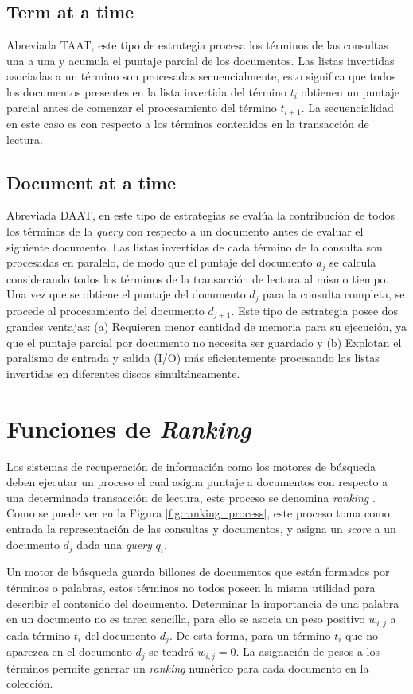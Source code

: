 \subsection{Term at a time}
Abreviada TAAT, este tipo de estrategia procesa los términos de las consultas una a una y acumula el puntaje parcial de los documentos. Las listas invertidas asociadas a un término son procesadas secuencialmente, esto significa que todos los documentos presentes en la lista invertida del término $t_{i}$ obtienen un puntaje parcial antes de comenzar el procesamiento del término $t_{i+1}$. La secuencialidad en este caso es con respecto a los términos contenidos en la transacción de lectura.

\subsection{Document at a time}
Abreviada DAAT, en este tipo de estrategias se evalúa la contribución de todos los términos de la \textit{query} con respecto a un documento antes de evaluar el siguiente documento. Las listas invertidas de cada término de la consulta son procesadas en paralelo, de modo que el puntaje del documento $d_{j}$ se calcula considerando todos los términos de la transacción de lectura al mismo tiempo. Una vez que se obtiene el puntaje del documento $d_{j}$ para la consulta completa, se procede al procesamiento del documento $d_{j+1}$. Este tipo de estrategia posee dos grandes ventajas: (a) Requieren menor cantidad de memoria para su ejecución, ya que el puntaje parcial por documento no necesita ser guardado y (b) Explotan el paralismo de entrada y salida (I/O) más eficientemente procesando las listas invertidas en diferentes discos simultáneamente.

\section{Funciones de \textit{Ranking}}
\label{marco:ranking}
Los sistemas de recuperación de información como los motores de búsqueda deben ejecutar un proceso el cual asigna puntaje a documentos con respecto a una determinada transacción de lectura, este proceso se denomina \textit{ranking} \citep{Baeza-Yates:2011}. Como se puede ver en la Figura \ref{fig:ranking_process}, este proceso toma como entrada la representación de las consultas y documentos, y asigna un \textit{score} a un documento $d_{j}$ dada una \textit{query} $q_{i}$.

Un motor de búsqueda guarda billones de documentos que están formados por términos o palabras, estos términos no todos poseen la misma utilidad para describir el contenido del documento. Determinar la importancia de una palabra en un documento no es tarea sencilla, para ello se asocia un peso positivo $w_{i,j}$ a cada término $t_{i}$ del documento $d_{j}$. De esta forma, para un término $t_{i}$ que no aparezca en el documento $d_{j}$ se tendrá $w_{i,j} = 0$. La asignación de pesos a los términos permite generar un \textit{ranking} numérico para cada documento en la colección.


